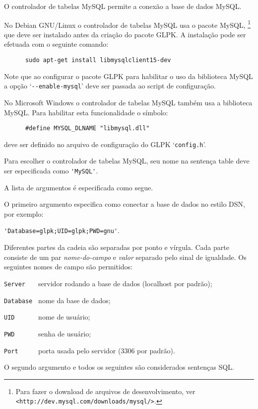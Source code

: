 \documentclass[11pt, brazil]{report}
\def\para#1{\noindent{\bf#1}}
\begin{document}
O controlador de tabelas MySQL permite a conexão a base de dados MySQL.

\para{Debian GNU/Linux.}
No Debian GNU/Linux o controlador de tabelas MySQL usa o pacote MySQL,
\footnote{Para fazer o download de arquivos de desenvolvimento, ver
{\tt<http://dev.mysql.com/downloads/mysql/>}.} que deve ser instalado
antes da criação do pacote GLPK. A instalação pode ser efetuada com
o seguinte comando:

\begin{verbatim}
      sudo apt-get install libmysqlclient15-dev
\end{verbatim}

Note que ao configurar o pacote GLPK para habilitar o uso da biblioteca MySQL
a opção `\verb|--enable-mysql|' deve ser passada ao script de
configuração.

\para{Microsoft Windows.}
No Microsoft Windows o controlador de tabelas MySQL também usa
a biblioteca MySQL. Para habilitar esta funcionalidade o símbolo:

\begin{verbatim}
      #define MYSQL_DLNAME "libmysql.dll"
\end{verbatim}

\noindent
deve ser definido no arquivo de configuração do GLPK `\verb|config.h|'.

Para escolher o controlador de tabelas MySQL, seu nome na sentença table deve
ser especificada como \verb|'MySQL'|.

A lista de argumentos é especificada como segue.

O primeiro argumento especifica como conectar a base de dados no estilo DSN,
por exemplo:

\verb|'Database=glpk;UID=glpk;PWD=gnu'|.

Diferentes partes da cadeia são separadas por ponto e vírgula. Cada parte
consiste de um par {\it nome-do-campo} e {\it valor} separado pelo sinal
de igualdade. Os seguintes nomes de campo são permitidos:


\verb|Server   | servidor rodando a base de dados (localhost por padrão);

\verb|Database | nome da base de dados;

\verb|UID      | nome de usuário;

\verb|PWD      | senha de usuário;

\verb|Port     | porta usada pelo servidor (3306 por padrão).

O segundo argumento e todos os seguintes são considerados sentenças SQL.
\end{document}
